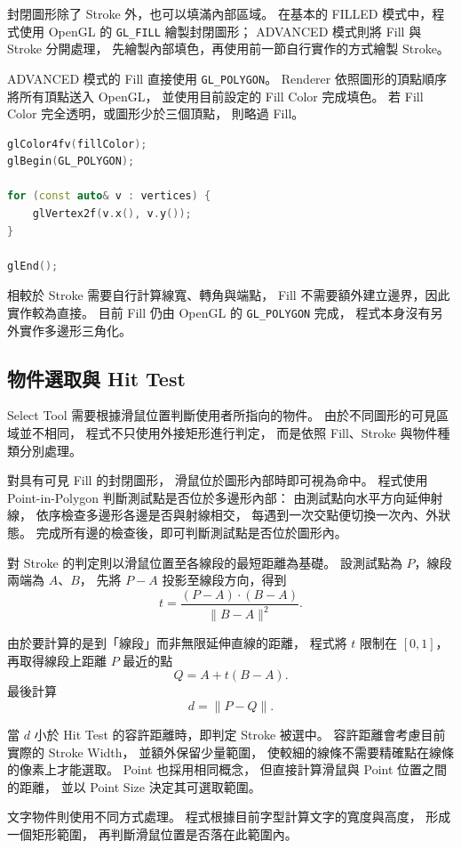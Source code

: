封閉圖形除了 Stroke 外，也可以填滿內部區域。
在基本的 FILLED 模式中，程式使用 OpenGL 的
\lstinline|GL_FILL| 繪製封閉圖形；
ADVANCED 模式則將 Fill 與 Stroke 分開處理，
先繪製內部填色，再使用前一節自行實作的方式繪製 Stroke。

ADVANCED 模式的 Fill 直接使用 \lstinline|GL_POLYGON|。
Renderer 依照圖形的頂點順序將所有頂點送入 OpenGL，
並使用目前設定的 Fill Color 完成填色。
若 Fill Color 完全透明，或圖形少於三個頂點，
則略過 Fill。

\begin{lstlisting}[language=C++]
glColor4fv(fillColor);
glBegin(GL_POLYGON);

for (const auto& v : vertices) {
    glVertex2f(v.x(), v.y());
}

glEnd();
\end{lstlisting}

相較於 Stroke 需要自行計算線寬、轉角與端點，
Fill 不需要額外建立邊界，因此實作較為直接。
目前 Fill 仍由 OpenGL 的 \lstinline|GL_POLYGON| 完成，
程式本身沒有另外實作多邊形三角化。


\subsection{物件選取與 Hit Test}

Select Tool 需要根據滑鼠位置判斷使用者所指向的物件。
由於不同圖形的可見區域並不相同，
程式不只使用外接矩形進行判定，
而是依照 Fill、Stroke 與物件種類分別處理。

對具有可見 Fill 的封閉圖形，
滑鼠位於圖形內部時即可視為命中。
程式使用 Point-in-Polygon 判斷測試點是否位於多邊形內部：
由測試點向水平方向延伸射線，
依序檢查多邊形各邊是否與射線相交，
每遇到一次交點便切換一次內、外狀態。
完成所有邊的檢查後，即可判斷測試點是否位於圖形內。

對 Stroke 的判定則以滑鼠位置至各線段的最短距離為基礎。
設測試點為 $P$，線段兩端為 $A$、$B$，
先將 $P-A$ 投影至線段方向，得到
$$
    t=
    \frac{(P-A)\cdot(B-A)}
    {\lVert B-A\rVert^2}.
$$

由於要計算的是到「線段」而非無限延伸直線的距離，
程式將 $t$ 限制在 $[0,1]$，
再取得線段上距離 $P$ 最近的點
$$
    Q=A+t(B-A).
$$
最後計算
$$
    d=\lVert P-Q\rVert.
$$

當 $d$ 小於 Hit Test 的容許距離時，即判定 Stroke 被選中。
容許距離會考慮目前實際的 Stroke Width，
並額外保留少量範圍，
使較細的線條不需要精確點在線條的像素上才能選取。
Point 也採用相同概念，
但直接計算滑鼠與 Point 位置之間的距離，
並以 Point Size 決定其可選取範圍。

文字物件則使用不同方式處理。
程式根據目前字型計算文字的寬度與高度，
形成一個矩形範圍，
再判斷滑鼠位置是否落在此範圍內。

